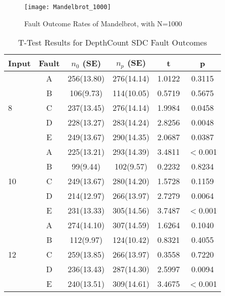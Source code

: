 \begin{figure}[htbp]
  \centering
  \texttt{[image: Mandelbrot\_1000]}
  \caption{Fault Outcome Rates of Mandelbrot, with N=1000}
  \label{fig:Mandelbrot_1000}
\end{figure}


\begin{table}[htbp]
\small{
\begin{center}
    \begin{tabular}{|p{0.7cm}|c|c|c|c|c|}
    \hline
    \textbf{Input} & \textbf{Fault} & \textbf{$n_0$ (SE)} & \textbf{$n_p$ (SE)} & \textbf{t} & \textbf{p} \\ \hline
    \multirow{5}{*}{8}
    & A & 256(13.80) & 276(14.14) & 1.0122 & 0.3115 \\
	& B & 106(9.73) & 114(10.05) & 0.5719 & 0.5675 \\
 	& C & 237(13.45) & 276(14.14) & 1.9984 & 0.0458 \\
 	& D & 228(13.27) & 283(14.24) & 2.8256 & 0.0048 \\
 	& E & 249(13.67) & 290(14.35) & 2.0687 & 0.0387 \\ \hline
    \multirow{5}{*}{10}
    & A & 225(13.21) & 293(14.39) & 3.4811 & $<$0.001 \\
	& B & 99(9.44) & 102(9.57) & 0.2232 & 0.8234 \\
 	& C & 249(13.67) & 280(14.20) & 1.5728 & 0.1159 \\
 	& D & 214(12.97) & 266(13.97) & 2.7279 & 0.0064 \\
 	& E & 231(13.33) & 305(14.56) & 3.7487 & $<$0.001 \\ \hline
 	\multirow{5}{*}{12}
    & A & 274(14.10) & 307(14.59) & 1.6264 & 0.1040 \\
	& B & 112(9.97) & 124(10.42) & 0.8321 & 0.4055 \\
 	& C & 259(13.85) & 266(13.97) & 0.3558 & 0.7220 \\
 	& D & 236(13.43) & 287(14.30) & 2.5997 & 0.0094 \\
 	& E & 240(13.51) & 309(14.61) & 3.4675 & $<$0.001 \\ \hline
    \hline
    \end{tabular}
    \end{center}
    }
    \caption{T-Test Results for DepthCount SDC Fault Outcomes}
    \label{tab:DepthCount_TTest}
\end{table}

